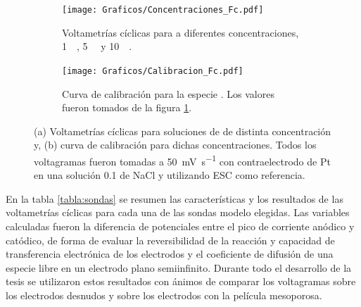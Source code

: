 {{ 	 				%
		 		 \begin{figure}[ht]
		 	      \begin{subfigure}[t]{0.495\textwidth}
		          	\texttt{[image: Graficos/Concentraciones\_Fc.pdf]}
		         	\caption{Voltametrías cíclicas para \fc\space a diferentes concentraciones, \SI{1}{\milli\Molar}, \SI{5}{\milli\Molar} y \SI{10}{\milli\Molar}.}
		          	\label{fig:Fc_a}
		      		\end{subfigure}
		      	 \begin{subfigure}[t]{0.495\textwidth}
		          	\texttt{[image: Graficos/Calibracion\_Fc.pdf]}
		         	\caption{Curva de calibración para la especie \fc. Los valores fueron tomados de la figura \ref{fig:Fc_a}.}
		          	\label{fig:Fc_b}
		      		\end{subfigure}
		      	 \caption[Respuesta electroquímica para \fc]{(a) Voltametrías cíclicas para soluciones de \fc\space de distinta concentración y, (b) curva de calibración para dichas concentraciones. Todos los voltagramas fueron tomadas a \SI{50}{\milli\volt\per\second} con contraelectrodo de Pt en una solución \SI{0.1}{\Molar} de NaCl y utilizando ESC como referencia.}
		      	 \label{Fig:Fc}
	      		 \end{figure}

		 En la tabla \ref{tabla:sondas} se resumen las características y los resultados de las voltametrías cíclicas para cada una de las sondas modelo elegidas. Las variables calculadas fueron la diferencia de potenciales entre el pico de corriente anódico y catódico, de forma de evaluar la reversibilidad de la reacción y capacidad de transferencia electrónica de los electrodos y el coeficiente de difusión de una especie libre en un electrodo plano semiinfinito. Durante todo el desarrollo de la tesis se utilizaron estos resultados con ánimos de comparar los voltagramas sobre los electrodos desnudos y sobre los electrodos con la película mesoporosa.
		  
}}
